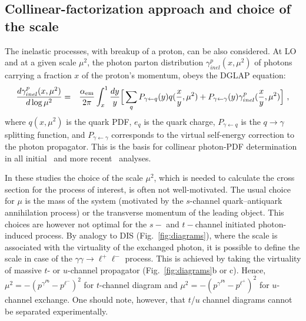 \subsection{Collinear-factorization approach and choice of the scale}

The inelastic processes, with breakup of a proton, can be also considered.
At LO and at a given scale $\mu^2$, the photon parton distribution $\gamma^p_{inel}(x,\mu^2)$ of photons carrying a fraction $x$ of the proton's momentum, obeys the DGLAP equation:
\begin{eqnarray}
{d \gamma^p_{inel}(x,\mu^2) \over d \log \mu^2} =&& {\alpha_{\rm{em}} \over 2 \pi} \int_x^1 {dy \over y} 
\Big [ \sum_q P_{\gamma \leftarrow q}(y) 
 q ({x \over y}, \mu^2 )   + P_{\gamma \leftarrow \gamma}(y) \gamma^p_{inel}({x \over y},\mu^2) \Big ]~,
\end{eqnarray}
where $q (x,\mu^2)$ is the quark PDF, $e_q$ is the quark charge, $P_{\gamma \leftarrow q}$ is the $q\rightarrow\gamma$ splitting function, and $P_{\gamma \leftarrow \gamma}$ corresponds to the virtual self-energy correction to the photon propagator.
This is the basis for collinear photon-PDF determination in all initial~\cite{Gluck:2002fi, Martin:2004dh} and more recent~\cite{Ball:2013hta, Martin:2014nqa, Schmidt:2014aba, Harland-Lang:2016kog, Giuli:2017oii, Manohar:2016nzj, Bertone:2017bme} analyses.

In these studies the choice of the scale $\mu^2$, which is needed to calculate the cross section for the process of interest, is often not well-motivated. 
The usual choice for $\mu$ is the mass of the system (motivated by the $s$-channel quark--antiquark annihilation process) or the transverse momentum of the leading object. 
This choices are however not optimal for the $s-$ and $t-$channel initiated photon-induced process.
By analogy to DIS (Fig.~\ref{fig:diagrams}), where the scale is associated with the virtuality of the exchanged photon, it is possible to define the scale in case of the $\gamma\gamma\rightarrow\ell^+\ell^-$ process.
This is achieved by taking the virtuality of massive $t$- or $u$-channel propagator (Fig.~\ref{fig:diagrams}b or c).
Hence, $\mu^2 = -(p^{\gamma^{Pb}}-p^{\ell^-})^2$ for $t$-channel diagram and $\mu^2 = -(p^{\gamma^{Pb}}-p^{\ell^+})^2$ for $u$-channel exchange.
One should note, however, that $t$/$u$ channel diagrams cannot be separated experimentally.

